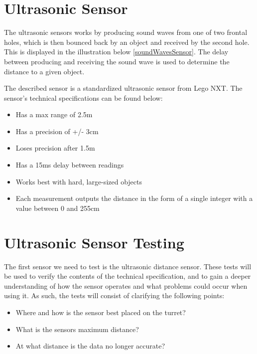 \section{Ultrasonic Sensor}\label{SensTheoUltra}
The ultrasonic sensors works by producing sound waves from
one of two frontal holes, which is then bounced back by an object and received
by the second hole. This is displayed in the illustration below
\autoref{soundWavesSensor}.
The delay between producing and receiving the sound wave is used to determine the
distance to a given object.


The described sensor is a standardized ultrasonic sensor from Lego NXT. The
sensor's technical specifications \citep{Ultrasonic_sensor} can be found below:
\begin{itemize}
  \item Has a max range of 2.5m
  \item Has a precision of +/- 3cm
  \item Loses precision after 1.5m
  \item Has a 15ms delay between readings
  \item Works best with hard, large-sized objects
  \item Each measurement outputs the distance in the form of a single integer
  with a value between 0 and 255cm
\end{itemize}


\section{Ultrasonic Sensor Testing}\label{SensorTest}
The first sensor we need to test is the ultrasonic distance sensor. These tests
will be used to verify the contents of the technical specification, and
to gain a deeper understanding of how the sensor operates and what
problems could occur when using it. As such, the tests will consist of
clarifying the following points:
\begin{itemize}
  \item Where and how is the sensor best placed on the turret?
  \item What is the sensors maximum distance?
  \item At what distance is the data no longer accurate?
\end{itemize}

